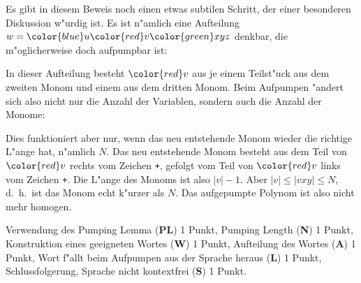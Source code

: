 \begin{diskussion}
Es gibt in diesem Beweis noch einen etwas subtilen Schritt, der einer
besonderen Diskussion w"urdig ist. Es ist n"amlich eine Aufteilung
$w={\color{blue}u}{\color{red}v}{\color{green}x}yz$ denkbar,
die m"oglicherweise doch aufpumpbar ist:
\begin{center}
\end{center}
In dieser Aufteilung besteht $\color{red}v$ aus je einem Teilst"uck
aus dem zweiten Monom und einem aus dem dritten Monom. Beim
Aufpumpen "andert sich also nicht nur die Anzahl der
Variablen, sondern auch die Anzahl der Monome:
\begin{center}
\end{center}
Dies funktioniert
aber nur, wenn das neu entstehende Monom wieder die richtige
L"ange hat, n"amlich $N$. Das neu entstehende Monom besteht
aus dem Teil von $\color{red}v$ rechts vom Zeichen \texttt{+},
gefolgt vom Teil von $\color{red}v$ links vom Zeichen \texttt{+}.
Die L"ange des Monoms ist also $|v|-1$. Aber $|v|\le |vxy|\le N$,
d.~h.~ist das Monom echt k"urzer als $N$. Das aufgepumpte Polynom ist
also nicht mehr homogen.
\end{diskussion}

\begin{bewertung}
Verwendung des Pumping Lemma ({\bf PL}) 1 Punkt,
Pumping Length ({\bf N}) 1 Punkt,
Konstruktion eines geeigneten Wortes ({\bf W}) 1 Punkt,
Aufteilung des Wortes ({\bf A}) 1 Punkt,
Wort f"allt beim Aufpumpen aus der Sprache heraus ({\bf L}) 1 Punkt,
Schlussfolgerung, Sprache nicht kontextfrei ({\bf S}) 1 Punkt.
\end{bewertung}

